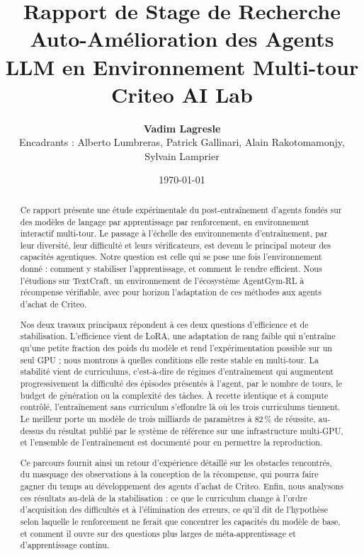 \documentclass[11pt,a4paper]{article}
\title{\Large \textbf{Rapport de Stage de Recherche}\\ \huge \textbf{Auto-Amélioration des Agents LLM en Environnement Multi-tour}\\ \large Criteo AI Lab}
\author{\textbf{Vadim Lagresle} \\ Encadrants : Alberto Lumbreras, Patrick Gallinari, Alain Rakotomamonjy, Sylvain Lamprier}
\date{\today}
\begin{document}
\maketitle

\vspace{2cm}



\begin{abstract}
\noindent Ce rapport présente une étude expérimentale du post-entraînement d'agents fondés sur des modèles de langage par apprentissage par renforcement, en environnement interactif multi-tour. Le passage à l'échelle des environnements d'entraînement, par leur diversité, leur difficulté et leurs vérificateurs, est devenu le principal moteur des capacités agentiques. Notre question est celle qui se pose une fois l'environnement donné : comment y stabiliser l'apprentissage, et comment le rendre efficient. Nous l'étudions sur TextCraft, un environnement de l'écosystème AgentGym-RL à récompense vérifiable, avec pour horizon l'adaptation de ces méthodes aux agents d'achat de Criteo.

Nos deux travaux principaux répondent à ces deux questions d'efficience et de stabilisation. L'efficience vient de LoRA, une adaptation de rang faible qui n'entraîne qu'une petite fraction des poids du modèle et rend l'expérimentation possible sur un seul GPU ; nous montrons à quelles conditions elle reste stable en multi-tour. La stabilité vient de curriculums, c'est-à-dire de régimes d'entraînement qui augmentent progressivement la difficulté des épisodes présentés à l'agent, par le nombre de tours, le budget de génération ou la complexité des tâches. À recette identique et à compute contrôlé, l'entraînement sans curriculum s'effondre là où les trois curriculums tiennent. Le meilleur porte un modèle de trois milliards de paramètres à 82\,\% de réussite, au-dessus du résultat publié par le système de référence sur une infrastructure multi-GPU, et l'ensemble de l'entraînement est documenté pour en permettre la reproduction.

Ce parcours fournit ainsi un retour d'expérience détaillé sur les obstacles rencontrés, du masquage des observations à la conception de la récompense, qui pourra faire gagner du temps au développement des agents d'achat de Criteo. Enfin, nous analysons ces résultats au-delà de la stabilisation : ce que le curriculum change à l'ordre d'acquisition des difficultés et à l'élimination des erreurs, ce qu'il dit de l'hypothèse selon laquelle le renforcement ne ferait que concentrer les capacités du modèle de base, et comment il ouvre sur des questions plus larges de méta-apprentissage et d'apprentissage continu.
\end{abstract}
\end{document}
